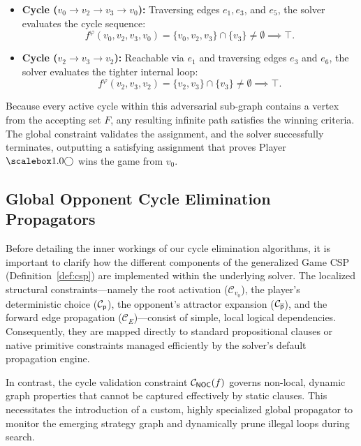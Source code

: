 \documentclass[a4paper,fleqn]{cas-sc}
\begin{document}
\begin{itemize}
    \item \textbf{Cycle ($v_0 \rightarrow v_2 \rightarrow v_3 \rightarrow v_0$):} Traversing edges $e_1, e_3$, and $e_5$, the solver evaluates the cycle sequence:
    \[
    f^\mathcal{\varphi}(v_0, v_2, v_3, v_0) = \{v_0, v_2, v_3\} \cap \{v_3\} \neq \emptyset \implies \top.
    \]
    \item \textbf{Cycle ($v_2 \rightarrow v_3 \rightarrow v_2$):} Reachable via $e_1$ and traversing edges $e_3$ and $e_6$, the solver evaluates the tighter internal loop:
    \[
    f^\mathcal{\varphi}(v_2, v_3, v_2) = \{v_2, v_3\} \cap \{v_3\} \neq \emptyset \implies \top.
    \]
\end{itemize}

Because every active cycle within this adversarial sub-graph contains a vertex from the accepting set $F$, any resulting infinite path satisfies the winning criteria. The global constraint validates the assignment, and the solver successfully terminates, outputting a satisfying assignment that proves Player~$\even$ wins the game from $v_0$.



\subsection{Global Opponent Cycle Elimination Propagators}
\label{sec:global_propagators}

Before detailing the inner workings of our cycle elimination algorithms, it is important to clarify how the different components of the generalized Game CSP (Definition~\ref{def:csp}) are implemented within the underlying solver. The localized structural constraints—namely the root activation ($\mathcal{C}_{v_0}$), the player's deterministic choice ($\mathcal{C}_{\mathsf{p}}$), the opponent's attractor expansion ($\mathcal{C}_{\overline{\mathsf{p}}}$), and the forward edge propagation ($\mathcal{C}_E$)—consist of simple, local logical dependencies. Consequently, they are mapped directly to standard propositional clauses or native primitive constraints managed efficiently by the solver's default propagation engine. 

In contrast, the cycle validation constraint $\mathcal{C}_{{\textsf{NOC}}}(f)$ governs non-local, dynamic graph properties that cannot be captured effectively by static clauses. This necessitates the introduction of a custom, highly specialized global propagator to monitor the emerging strategy graph and dynamically prune illegal loops during search.
\end{document}
